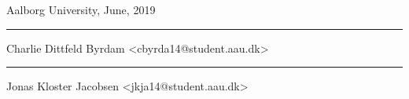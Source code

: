 {{        %

%
    }}

\label{page:titlepage}
\clearpage

\vspace{\baselineskip}\hfill Aalborg University, June, 2019
\vfill\noindent
\begin{minipage}[b]{0.45\textwidth}
    \centering
    \rule{\textwidth}{0.5pt}\smallbreak
    Charlie Dittfeld Byrdam\smallbreak
    {\footnotesize <cbyrda14@student.aau.dk>}
\end{minipage}
\hfill
\vspace{3\baselineskip}
\begin{minipage}[b]{0.45\textwidth}
    \centering
    \rule{\textwidth}{0.5pt}\smallbreak
    Jonas Kloster Jacobsen\smallbreak
    {\footnotesize <jkja14@student.aau.dk>}
\end{minipage}